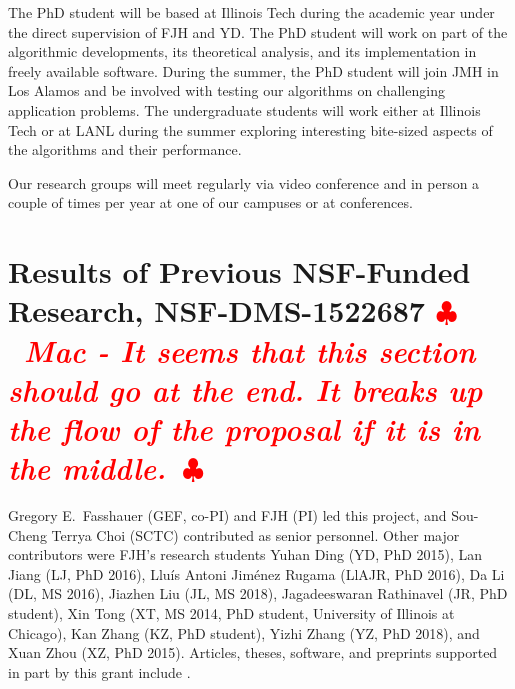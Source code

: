 \documentclass[11pt]{NSFamsart}
\newif\ifnotesw \noteswtrue
\newcommand{\notes}[1]{\ifnotesw \textcolor{red}{  $\clubsuit$\ {\sf \bf \it  #1}\ $\clubsuit$  }\fi}
\begin{document}
The PhD student will be based at Illinois Tech during the academic year under the direct supervision of FJH and YD.  The PhD student will work on part of the algorithmic developments, its theoretical analysis, and its implementation in freely available software.  During the summer, the PhD student will join JMH in Los Alamos and be involved with testing our algorithms on challenging application problems.  The undergraduate students will work either at Illinois Tech or at LANL during the summer exploring interesting bite-sized aspects of the algorithms and their performance.

Our research groups will meet regularly via video conference and in person a couple of times per year at one of our campuses or at conferences.


\section{Results of Previous NSF-Funded Research,
NSF-DMS-1522687
\notes{Mac - It seems that this section should go at the end.  It breaks up the flow of the proposal if it is in the middle.}
} \label{sec:Previous}

Gregory E.\ Fasshauer (GEF, co-PI) and FJH (PI) led this project, and Sou-Cheng Terrya Choi (SCTC) contributed as senior personnel.  Other major contributors were FJH's research students Yuhan Ding (YD, PhD 2015), Lan Jiang (LJ, PhD 2016), 
Llu\'is Antoni Jim\'enez Rugama (LlAJR, PhD 2016), Da Li (DL, MS 2016), Jiazhen Liu (JL, MS 2018), Jagadeeswaran Rathinavel (JR, 
PhD student), Xin Tong (XT, MS 2014, PhD student, University of Illinois at Chicago), Kan Zhang (KZ, PhD student), Yizhi Zhang (YZ, PhD 2018), and Xuan Zhou (XZ, PhD 2015).  Articles, theses,  
software, and preprints supported in 
part by this 
grant 
include 
\cite{ala_augmented_2017, 
	ChoEtal17a,
	ChoEtal17b,
	Din15a, 
	DinHic20a,
	GilEtal16a,
	Hic17a,
	HicJag18b,
	HicJim16a,
	HicEtal18a,
	HicEtal17a,
	HicKriWoz19a,
	RatHic19a,
	GilJim16b,
	JimHic16a,
	JohFasHic18a,
	Li16a,
	Liu17a,
	MarEtal18a,
	mccourt_stable_2017,
	MCCEtal19a,
	mishra_hybrid_2018,
	MisEtal19a,
	rashidinia_stable_2016,
	rashidinia_stable_2018,
	Zha18a,
	Zha17a,
	Zho15a,
	ZhoHic15a}.
\end{document}
